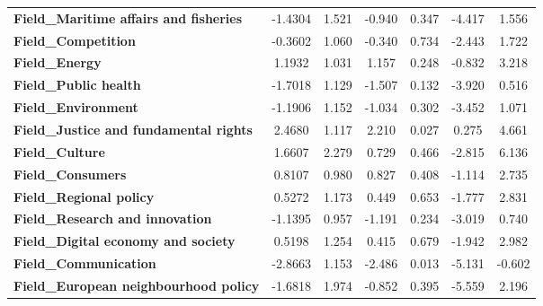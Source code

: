 \documentclass[ 11pt]{article}
\begin{document}
\begin{center}
\begin{longtable}{lcccccc}
\textbf{Field\_Maritime affairs and fisheries}             &      -1.4304  &        1.521     &    -0.940  &         0.347        &       -4.417    &        1.556     \\
\textbf{Field\_Competition}                                &      -0.3602  &        1.060     &    -0.340  &         0.734        &       -2.443    &        1.722     \\
\textbf{Field\_Energy}                                     &       1.1932  &        1.031     &     1.157  &         0.248        &       -0.832    &        3.218     \\
\textbf{Field\_Public health}                              &      -1.7018  &        1.129     &    -1.507  &         0.132        &       -3.920    &        0.516     \\
\textbf{Field\_Environment}                                &      -1.1906  &        1.152     &    -1.034  &         0.302        &       -3.452    &        1.071     \\
\textbf{Field\_Justice and fundamental rights}             &       2.4680  &        1.117     &     2.210  &         0.027        &        0.275    &        4.661     \\
\textbf{Field\_Culture}                                    &       1.6607  &        2.279     &     0.729  &         0.466        &       -2.815    &        6.136     \\
\textbf{Field\_Consumers}                                  &       0.8107  &        0.980     &     0.827  &         0.408        &       -1.114    &        2.735     \\
\textbf{Field\_Regional policy}                            &       0.5272  &        1.173     &     0.449  &         0.653        &       -1.777    &        2.831     \\
\textbf{Field\_Research and innovation}                    &      -1.1395  &        0.957     &    -1.191  &         0.234        &       -3.019    &        0.740     \\
\textbf{Field\_Digital economy and society}                &       0.5198  &        1.254     &     0.415  &         0.679        &       -1.942    &        2.982     \\
\textbf{Field\_Communication}                              &      -2.8663  &        1.153     &    -2.486  &         0.013        &       -5.131    &       -0.602     \\
\textbf{Field\_European neighbourhood policy}              &      -1.6818  &        1.974     &    -0.852  &         0.395        &       -5.559    &        2.196     \\

\end{longtable}
\end{center}
\end{document}
